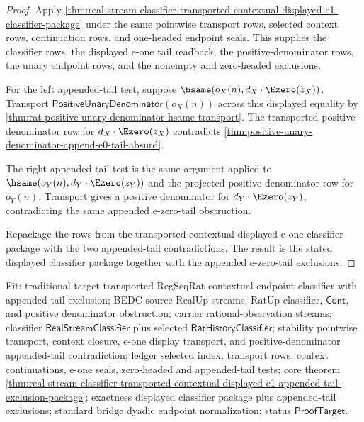 \begin{proof}
Apply
\autoref{thm:real-stream-classifier-transported-contextual-displayed-e1-classifier-package}
under the same pointwise transport rows, selected context rows, continuation rows,
and one-headed endpoint seals. This supplies the classifier rows, the displayed
e-one tail readback, the positive-denominator rows, the unary endpoint rows, and
the nonempty and zero-headed exclusions.

For the left appended-tail test, suppose
$\hsame(o_X(n),d_X\cdot\Ezero(z_X))$. Transport
$\mathsf{PositiveUnaryDenominator}(o_X(n))$ across this displayed equality by
\autoref{thm:rat-positive-unary-denominator-hsame-transport}. The transported
positive-denominator row for $d_X\cdot\Ezero(z_X)$ contradicts
\autoref{thm:positive-unary-denominator-append-e0-tail-absurd}.

The right appended-tail test is the same argument applied to
$\hsame(o_Y(n),d_Y\cdot\Ezero(z_Y))$ and the projected positive-denominator row
for $o_Y(n)$. Transport gives a positive denominator for
$d_Y\cdot\Ezero(z_Y)$, contradicting the same appended e-zero-tail obstruction.

Repackage the rows from the transported contextual displayed e-one classifier
package with the two appended-tail contradictions. The result is the stated
displayed classifier package together with the appended e-zero-tail exclusions.
\end{proof}

Fit: traditional target transported RegSeqRat contextual endpoint classifier
with appended-tail exclusion; BEDC source RealUp streams, RatUp classifier,
$\mathsf{Cont}$, and positive denominator obstruction; carrier
rational-observation streams; classifier $\mathsf{RealStreamClassifier}$ plus
selected $\mathsf{RatHistoryClassifier}$; stability pointwise transport, context
closure, e-one display transport, and positive-denominator appended-tail
contradiction; ledger selected index, transport rows, context continuations,
e-one seals, zero-headed and appended-tail tests; core theorem
\autoref{thm:real-stream-classifier-transported-contextual-displayed-e1-appended-tail-exclusion-package};
exactness displayed classifier package plus appended-tail exclusions; standard
bridge dyadic endpoint normalization; status $\mathsf{ProofTarget}$.
